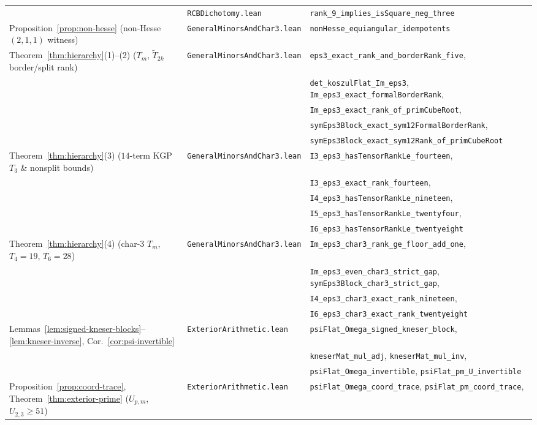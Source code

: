 \documentclass[11pt,reqno]{amsart}
\theoremstyle{definition}
\theoremstyle{remark}
\numberwithin{equation}{section}
\begin{document}
\begin{table}[htbp]
{\begin{tabular}{@{}lll@{}}
 & \texttt{RCBDichotomy.lean} & \texttt{rank\_9\_implies\_isSquare\_neg\_three} \\
Proposition~\ref{prop:non-hesse} (non-Hesse $(2,1,1)$ witness) & \texttt{GeneralMinorsAndChar3.lean} & \texttt{nonHesse\_equiangular\_idempotents} \\
Theorem~\ref{thm:hierarchy}(1)--(2) ($T_m$, $\widetilde{T}_{2k}$ border/split rank) & \texttt{GeneralMinorsAndChar3.lean} & \texttt{eps3\_exact\_rank\_and\_borderRank\_five}, \\
 & & \texttt{det\_koszulFlat\_Im\_eps3}, \texttt{Im\_eps3\_exact\_formalBorderRank}, \\
 & & \texttt{Im\_eps3\_exact\_rank\_of\_primCubeRoot}, \\
 & & \texttt{symEps3Block\_exact\_sym12FormalBorderRank}, \\
 & & \texttt{symEps3Block\_exact\_sym12Rank\_of\_primCubeRoot} \\
Theorem~\ref{thm:hierarchy}(3) ($14$-term KGP $T_3$ \& nonsplit bounds) & \texttt{GeneralMinorsAndChar3.lean} & \texttt{I3\_eps3\_hasTensorRankLe\_fourteen}, \\
 & & \texttt{I3\_eps3\_exact\_rank\_fourteen}, \\
 & & \texttt{I4\_eps3\_hasTensorRankLe\_nineteen}, \\
 & & \texttt{I5\_eps3\_hasTensorRankLe\_twentyfour}, \\
 & & \texttt{I6\_eps3\_hasTensorRankLe\_twentyeight} \\
Theorem~\ref{thm:hierarchy}(4) (char-$3$ $T_m$, $T_4 = 19$, $T_6 = 28$) & \texttt{GeneralMinorsAndChar3.lean} & \texttt{Im\_eps3\_char3\_rank\_ge\_floor\_add\_one}, \\
 & & \texttt{Im\_eps3\_even\_char3\_strict\_gap}, \texttt{symEps3Block\_char3\_strict\_gap}, \\
 & & \texttt{I4\_eps3\_char3\_exact\_rank\_nineteen}, \\
 & & \texttt{I6\_eps3\_char3\_exact\_rank\_twentyeight} \\
Lemmas~\ref{lem:signed-kneser-blocks}--\ref{lem:kneser-inverse}, Cor.~\ref{cor:psi-invertible} & \texttt{ExteriorArithmetic.lean} & \texttt{psiFlat\_Omega\_signed\_kneser\_block}, \\
 & & \texttt{kneserMat\_mul\_adj}, \texttt{kneserMat\_mul\_inv}, \\
 & & \texttt{psiFlat\_Omega\_invertible}, \texttt{psiFlat\_pm\_U\_invertible} \\
Proposition~\ref{prop:coord-trace}, Theorem~\ref{thm:exterior-prime} ($U_{p,m}$, $U_{2,3} \ge 51$) & \texttt{ExteriorArithmetic.lean} & \texttt{psiFlat\_Omega\_coord\_trace}, \texttt{psiFlat\_pm\_coord\_trace}, \\

\end{tabular}}
\end{table}
\end{document}
